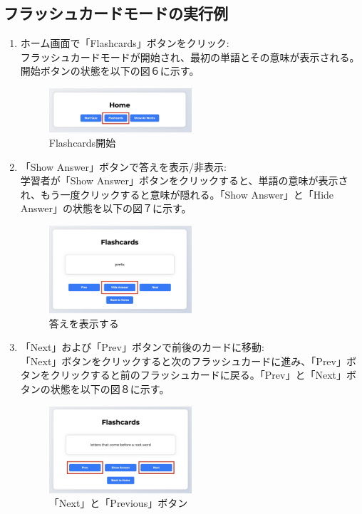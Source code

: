 \documentclass[]{jsarticle}
\begin{document}
\subsection{フラッシュカードモードの実行例}

\begin{enumerate}
    \item ホーム画面で「Flashcards」ボタンをクリック:\\
        フラッシュカードモードが開始され、最初の単語とその意味が表示される。開始ボタンの状態を以下の図６に示す。
        
        \begin{figure}[H]
        \centering
        \includegraphics[width=0.5\textwidth]{flashcards-display.jpg}
        \caption{Flashcards開始}
        \end{figure}

    \item 「Show Answer」ボタンで答えを表示/非表示:\\
        学習者が「Show Answer」ボタンをクリックすると、単語の意味が表示され、もう一度クリックすると意味が隠れる。「Show Answer」と「Hide Answer」の状態を以下の図７に示す。
        
        \begin{figure}[H]
        \centering
        \includegraphics[width=0.5\textwidth]{show-hide-button.jpg}
        \caption{答えを表示する}
        \end{figure}

    \item 「Next」および「Prev」ボタンで前後のカードに移動:\\
        「Next」ボタンをクリックすると次のフラッシュカードに進み、「Prev」ボタンをクリックすると前のフラッシュカードに戻る。「Prev」と「Next」ボタンの状態を以下の図８に示す。
        
        \begin{figure}[H]
        \centering
        \includegraphics[width=0.5\textwidth]{prev-next-button.jpg}
        \caption{「Next」と「Previous」ボタン}
        \end{figure}
\end{enumerate}
\end{document}
